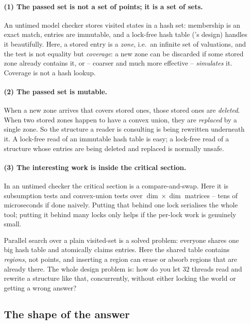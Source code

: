\paragraph{(1) The passed set is not a set of points; it is a set of sets.}
An untimed model checker stores visited states in a hash set: membership is an
exact match, entries are immutable, and a lock-free hash table (\ltsmin{}'s
design) handles it beautifully.  Here, a stored entry is a \emph{zone}, i.e.\
an infinite set of valuations, and the test is not equality but
\emph{coverage}: a new zone can be discarded if some stored zone already
contains it, or -- coarser and much more effective -- \emph{simulates} it.
Coverage is not a hash lookup.

\paragraph{(2) The passed set is mutable.}
When a new zone arrives that covers stored ones, those stored ones are
\emph{deleted}.  When two stored zones happen to have a convex union, they are
\emph{replaced} by a single zone.  So the structure a reader is consulting is
being rewritten underneath it.  A lock-free read of an immutable hash table is
easy; a lock-free read of a structure whose entries are being deleted and
replaced is normally unsafe.

\paragraph{(3) The interesting work is inside the critical section.}
In an untimed checker the critical section is a compare-and-swap.  Here it is
subsumption tests and convex-union tests over $\dim \times \dim$ matrices --
tens of microseconds if done naively.  Putting that behind one lock serialises
the whole tool; putting it behind many locks only helps if the per-lock work is
genuinely small.

\begin{intuition}
Parallel search over a plain visited-set is a solved problem: everyone shares
one big hash table and atomically claims entries.  Here the shared table
contains \emph{regions}, not points, and inserting a region can erase or absorb
regions that are already there.  The whole design problem is: how do you let
$32$ threads read and rewrite a structure like that, concurrently, without
either locking the world or getting a wrong answer?
\end{intuition}

\subsection{The shape of the answer}


